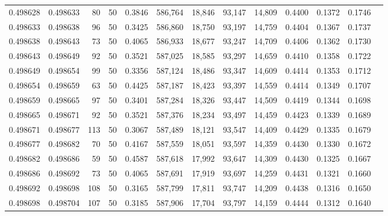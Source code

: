 \begin{tabular}{rrrrrrrrrrrrr}
0.498628 & 0.498633 &    80 &  50 &                                     0.3846 & 586,764 &  18,846 &  93,147 &  14,809 & 0.4400 & 0.1372 & 0.1746 \\
0.498633 & 0.498638 &    96 &  50 &                                     0.3425 & 586,860 &  18,750 &  93,197 &  14,759 & 0.4404 & 0.1367 & 0.1737 \\
0.498638 & 0.498643 &    73 &  50 &                                     0.4065 & 586,933 &  18,677 &  93,247 &  14,709 & 0.4406 & 0.1362 & 0.1730 \\
0.498643 & 0.498649 &    92 &  50 &                                     0.3521 & 587,025 &  18,585 &  93,297 &  14,659 & 0.4410 & 0.1358 & 0.1722 \\
0.498649 & 0.498654 &    99 &  50 &                                     0.3356 & 587,124 &  18,486 &  93,347 &  14,609 & 0.4414 & 0.1353 & 0.1712 \\
0.498654 & 0.498659 &    63 &  50 &                                     0.4425 & 587,187 &  18,423 &  93,397 &  14,559 & 0.4414 & 0.1349 & 0.1707 \\
0.498659 & 0.498665 &    97 &  50 &                                     0.3401 & 587,284 &  18,326 &  93,447 &  14,509 & 0.4419 & 0.1344 & 0.1698 \\
0.498665 & 0.498671 &    92 &  50 &                                     0.3521 & 587,376 &  18,234 &  93,497 &  14,459 & 0.4423 & 0.1339 & 0.1689 \\
0.498671 & 0.498677 &   113 &  50 &                                     0.3067 & 587,489 &  18,121 &  93,547 &  14,409 & 0.4429 & 0.1335 & 0.1679 \\
0.498677 & 0.498682 &    70 &  50 &                                     0.4167 & 587,559 &  18,051 &  93,597 &  14,359 & 0.4430 & 0.1330 & 0.1672 \\
0.498682 & 0.498686 &    59 &  50 &                                     0.4587 & 587,618 &  17,992 &  93,647 &  14,309 & 0.4430 & 0.1325 & 0.1667 \\
0.498686 & 0.498692 &    73 &  50 &                                     0.4065 & 587,691 &  17,919 &  93,697 &  14,259 & 0.4431 & 0.1321 & 0.1660 \\
0.498692 & 0.498698 &   108 &  50 &                                     0.3165 & 587,799 &  17,811 &  93,747 &  14,209 & 0.4438 & 0.1316 & 0.1650 \\
0.498698 & 0.498704 &   107 &  50 &                                     0.3185 & 587,906 &  17,704 &  93,797 &  14,159 & 0.4444 & 0.1312 & 0.1640 \\

\end{tabular}
